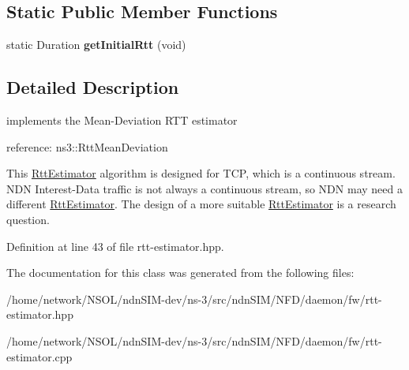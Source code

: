 \subsection*{Static Public Member Functions}
\begin{DoxyCompactItemize}
\item 
static Duration {\bfseries get\+Initial\+Rtt} (void)\hypertarget{classnfd_1_1RttEstimator_a6853028de7ccdda04cd21ea9c11d55b4}{}\label{classnfd_1_1RttEstimator_a6853028de7ccdda04cd21ea9c11d55b4}

\end{DoxyCompactItemize}


\subsection{Detailed Description}
implements the Mean-\/\+Deviation R\+TT estimator 

reference\+: ns3\+::\+Rtt\+Mean\+Deviation

This \hyperlink{classnfd_1_1RttEstimator}{Rtt\+Estimator} algorithm is designed for T\+CP, which is a continuous stream. N\+DN Interest-\/\+Data traffic is not always a continuous stream, so N\+DN may need a different \hyperlink{classnfd_1_1RttEstimator}{Rtt\+Estimator}. The design of a more suitable \hyperlink{classnfd_1_1RttEstimator}{Rtt\+Estimator} is a research question. 

Definition at line 43 of file rtt-\/estimator.\+hpp.



The documentation for this class was generated from the following files\+:\begin{DoxyCompactItemize}
\item 
/home/network/\+N\+S\+O\+L/ndn\+S\+I\+M-\/dev/ns-\/3/src/ndn\+S\+I\+M/\+N\+F\+D/daemon/fw/rtt-\/estimator.\+hpp\item 
/home/network/\+N\+S\+O\+L/ndn\+S\+I\+M-\/dev/ns-\/3/src/ndn\+S\+I\+M/\+N\+F\+D/daemon/fw/rtt-\/estimator.\+cpp\end{DoxyCompactItemize}
